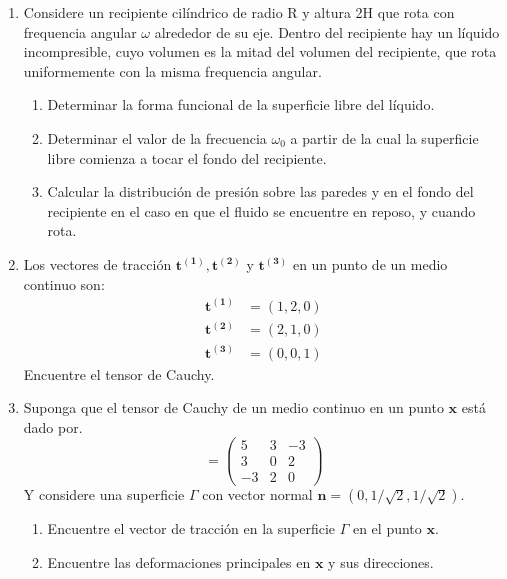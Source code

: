 \documentclass[12pt,a4paper]{article}
\begin{document}
\begin{enumerate}
\begin{figure}[h]
    \end{figure}
    \item Considere un recipiente cilíndrico de radio R y altura 2H
    que rota con frequencia angular $\omega$
    alrededor de su eje. Dentro del recipiente hay un líquido incompresible,
    cuyo volumen es la mitad del volumen del recipiente, que rota uniformemente con la
    misma frequencia angular.
    \begin{enumerate}
        \item Determinar la forma funcional de la superficie libre del líquido.
        \item Determinar el valor de la frecuencia $\omega_0$
        a partir de la cual la superficie libre
        comienza a tocar el fondo del recipiente.
        \item Calcular la distribución de presión sobre las paredes y en el fondo del recipiente
        en el caso en que el fluido se encuentre en reposo, y cuando rota.
    \end{enumerate}
    \item Los vectores de tracción $\mathbf{t^{(1)}, t^{(2)}}$ y $\mathbf{t^{(3)}}$ en un punto de un medio continuo son:   
    \begin{align}
        \mathbf{t^{(1)}} &= (1,2,0) \\
        \mathbf{t^{(2)}} &= (2,1,0) \\
        \mathbf{t^{(3)}} &= (0,0,1)
    \end{align} 
    Encuentre el tensor de Cauchy.
    \item Suponga que el tensor de Cauchy de un medio continuo en un punto $\mathbf{x}$ está dado por.
    \begin{equation}
        [\sigma]=\begin{pmatrix}
            5 & 3 & -3\\
            3 & 0 & 2\\
            -3 & 2 & 0
            \end{pmatrix}
    \end{equation}
    Y considere una superficie $\Gamma$ con vector normal $\mathbf{n}=(0,1/\sqrt{2},1/\sqrt{2})$.
    \begin{enumerate}
        \item Encuentre el vector de tracción en la superficie $\Gamma$ en el punto $\mathbf{x}$.
        \item Encuentre las deformaciones principales en $\mathbf{x}$ y sus direcciones.
    \end{enumerate}
\end{enumerate}
\end{document}
